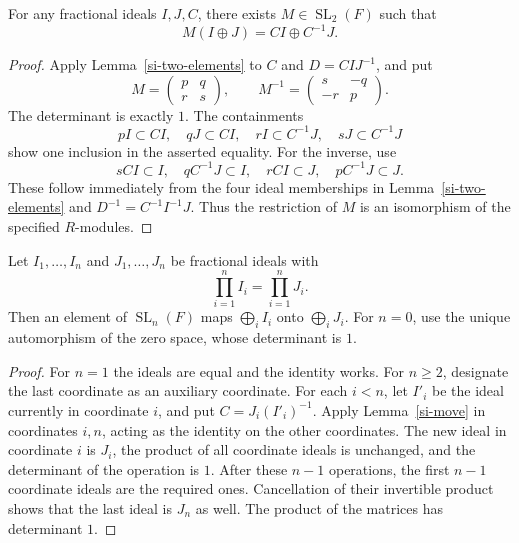 \begin{lemma}\label{si-move}
For any fractional ideals \(I,J,C\), there exists
\(M\in\operatorname{SL}_2(F)\) such that
\[
                       M(I\oplus J)
                            =CI\oplus C^{-1}J.
\]
\end{lemma}
\begin{proof}
Apply Lemma~\ref{si-two-elements} to \(C\) and
\(D=CIJ^{-1}\), and put
\[
       M=\begin{pmatrix}p&q\\r&s\end{pmatrix},
       \qquad
       M^{-1}=\begin{pmatrix}s&-q\\-r&p\end{pmatrix}.
\]
The determinant is exactly \(1\).
The containments
\[
 pI\subset CI,\quad qJ\subset CI,\quad
 rI\subset C^{-1}J,\quad sJ\subset C^{-1}J
\]
show one inclusion in the asserted equality.
For the inverse, use
\[
 sCI\subset I,\quad qC^{-1}J\subset I,\quad
 rCI\subset J,\quad pC^{-1}J\subset J.
\]
These follow immediately from the four ideal memberships
in Lemma~\ref{si-two-elements} and
\(D^{-1}=C^{-1}I^{-1}J\).
Thus the restriction of \(M\) is an isomorphism of the
specified \(R\)-modules.
\end{proof}

\begin{proposition}\label{si-equal-product}
Let \(I_1,\ldots,I_n\) and \(J_1,\ldots,J_n\) be
fractional ideals with
\[
                         \prod_{i=1}^n I_i
                              =\prod_{i=1}^n J_i.
\]
Then an element of \(\operatorname{SL}_n(F)\) maps
\(\bigoplus_i I_i\) onto \(\bigoplus_i J_i\).
For \(n=0\), use the unique automorphism of the zero
space, whose determinant is \(1\).
\end{proposition}
\begin{proof}
For \(n=1\) the ideals are equal and the identity works.
For \(n\ge2\), designate the last coordinate as an
auxiliary coordinate.
For each \(i<n\), let \(I'_i\) be the ideal currently
in coordinate \(i\), and put \(C=J_i(I'_i)^{-1}\).
Apply Lemma~\ref{si-move} in coordinates \(i,n\),
acting as the identity on the other coordinates.
The new ideal in coordinate \(i\) is \(J_i\),
the product of all coordinate ideals is unchanged,
and the determinant of the operation is \(1\).
After these \(n-1\) operations, the first \(n-1\)
coordinate ideals are the required ones.
Cancellation of their invertible product shows that
the last ideal is \(J_n\) as well.
The product of the matrices has determinant \(1\).
\end{proof}


